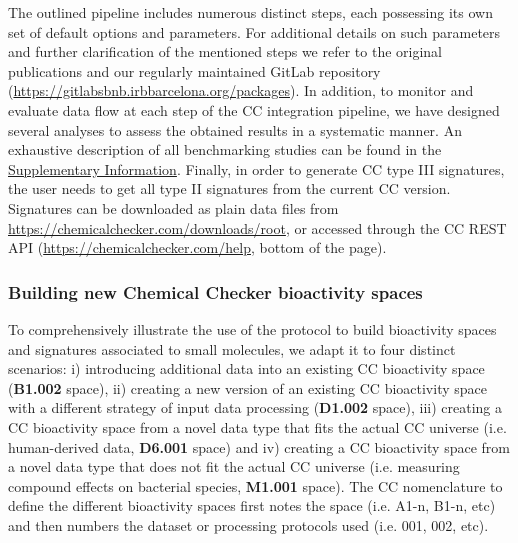 The outlined pipeline includes numerous distinct steps, each possessing its own set of default options and parameters. For additional details on such parameters and further clarification of the mentioned steps we refer to the original publications\cite{duran-frigola_extending_2020, bertoni_bioactivity_2021} and our regularly maintained GitLab repository (\hyperlink{https://gitlabsbnb.irbbarcelona.org/packages}{https://gitlabsbnb.irbbarcelona.org/packages}). In addition, to monitor and evaluate data flow at each step of the CC integration pipeline, we have designed several analyses to assess the obtained results in a systematic manner. An exhaustive description of all benchmarking studies can be found in the \hyperref[Protocols_SupplementaryInformation]{Supplementary Information}. Finally, in order to generate CC type III signatures, the user needs to get all type II signatures from the current CC version. Signatures can be downloaded as plain data files from \hyperlink{https://chemicalchecker.com/downloads/root}{https://chemicalchecker.com/downloads/root}, or accessed through the CC REST API (\hyperlink{https://chemicalchecker.com/help}{https://chemicalchecker.com/help}, bottom of the page).


\subsubsection{Building new Chemical Checker bioactivity spaces}

To comprehensively illustrate the use of the protocol to build bioactivity spaces and signatures associated to small molecules, we adapt it to four distinct scenarios: i) introducing additional data into an existing CC bioactivity space (\textbf{B1.002} space), ii) creating a new version of an existing CC bioactivity space with a different strategy of input data processing (\textbf{D1.002} space), iii) creating a CC bioactivity space from a novel data type that fits the actual CC universe (i.e. human-derived data, \textbf{D6.001} space) and iv) creating a CC bioactivity space from a novel data type that does not fit the actual CC universe (i.e. measuring compound effects on bacterial species, \textbf{M1.001} space). The CC nomenclature to define the different bioactivity spaces first notes the space (i.e. A1-n, B1-n, etc) and then numbers the dataset or processing protocols used (i.e. 001, 002, etc).